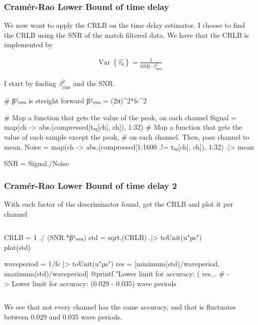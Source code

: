 \documentclass[compress]{beamer}
\DeclareMathOperator*{\Var}{Var}
\begin{document}
\begin{frame}[fragile] %
    \frametitle{ Cramér-Rao Lower Bound of time delay }
    We now want to apply the CRLB on the time delay estimator. I choose to
    find the CRLB using the SNR of the match filtered data. We have that the
    CRLB is implemented by

    \begin{gather*}
        \Var\left\{\hat{\tau_0}\right\} = \frac{1}{\text{SNR}\cdot \beta^2_\text{rms}}
    \end{gather*}
    
    I start by finding $\beta^2_\text{rms}$ and the SNR.

    \begin{jllisting}[gobble=8]
        # β²ᵣₘₛ is streight forward
        β²ᵣₘₛ = (2π)^2*fc^2

        # Map a function that gets the value of the peak, on each channel
        Signal = map(ch -> abs.(compressed[τₓ₀[ch], ch]), 1:32)
        # Map a function that gets the value of each sample except the peak, 
        # on each channel. Then, pass channel to mean.
        Noise =  map(ch -> abs.(compressed[1:1600 .!= τₓ₀[ch], ch]), 1:32) .|> mean

        SNR = Signal./Noise
    \end{jllisting}
\end{frame}

\begin{frame}[fragile] %
    \frametitle{Cramér-Rao Lower Bound of time delay 2}
    With each factor of the descriminator found, get the CRLB and plot it per channel
    \begin{columns}
        \begin{column}{0.5\textwidth}
            \begin{jllisting}[gobble=16]
                CRLB = 1 ./ (SNR.*β²ᵣₘₛ)
                std = sqrt.(CRLB) .|> toUnit(u"µs")
                plot(std)

                waveperiod = 1/fc |> toUnit(u"µs")
                res = [minimum(std)/waveperiod, 
                       maximum(std)/waveperiod]
                @printf "Lower limit for accuracy: 
                        (%
                        res...
                # -> Lower limit for accuracy: (0.029 - 0.035) wave periods
            \end{jllisting}
        \end{column}
        \begin{column}{0.5\textwidth}
            \begin{figure}
                
            \end{figure}
        \end{column}
    \end{columns}
    We see that not every channel has the same accuracy, and that is fluctuates
    between 0.029 and 0.035 wave periods.
\end{frame}
\end{document}
